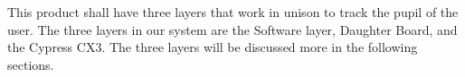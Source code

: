 
This product shall have three layers that work in unison to track the pupil of the user. The three layers in our system are the Software layer, Daughter Board, and the Cypress CX3. The three layers will be discussed more in the following sections.